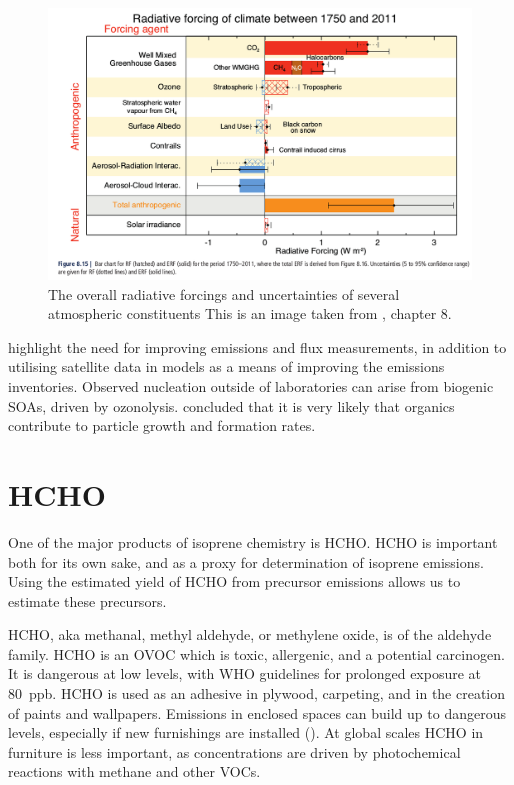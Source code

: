     \begin{figure}
      \includegraphics[width=\textwidth]{Figures/IPCC_WG1AR5_RFSummary.png}
      \caption{%
        The overall radiative forcings and uncertainties of several atmospheric constituents
        This is an image taken from \cite{IPCC_AR5_WG1}, chapter 8.}
      \label{LR:VOCs:IsopCascade:SOA:fig_IPCC_RF_AR5}
    \end{figure}    
    
    \cite{Kanakidou2005} highlight the need for improving emissions and flux measurements, in addition to utilising satellite data in models as a means of improving the emissions inventories.
    Observed nucleation outside of laboratories can arise from biogenic SOAs, driven by ozonolysis.
    \cite{Kanakidou2005} concluded that it is very likely that organics contribute to particle growth and formation rates.
    
\section{HCHO}
\label{LR:HCHO}
  
  One of the major products of isoprene chemistry is HCHO.
  HCHO is important both for its own sake, and as a proxy for determination of isoprene emissions.
  Using the estimated yield of HCHO from precursor emissions allows us to estimate these precursors.
  
  HCHO, aka methanal, methyl aldehyde, or methylene oxide, is of the aldehyde family.
  HCHO is an OVOC which is toxic, allergenic, and a potential carcinogen. 
  It is dangerous at low levels, with WHO guidelines for prolonged exposure at 80~ppb.
  HCHO is used as an adhesive in plywood, carpeting, and in the creation of paints and wallpapers.
  Emissions in enclosed spaces can build up to dangerous levels, especially if new furnishings are installed (\cite{Davenport2015}).
  At global scales HCHO in furniture is less important, as concentrations are driven by photochemical reactions with methane and other VOCs.
  
